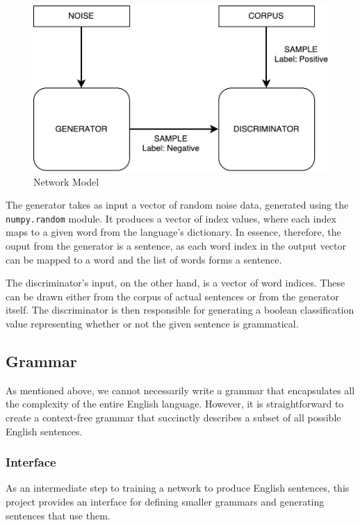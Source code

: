 \documentclass[11pt]{article}
\begin{document}
\begin{figure}[ht]
    \centering
    \includegraphics[scale=0.5]{img/network_model.pdf}
    \caption{Network Model}
    \label{fig:net_model}
\end{figure}

The generator takes as input a vector of random noise data, generated using the \texttt{numpy.random} module. It produces a vector of index values, where each index maps to a given word from the language's dictionary. In essence, therefore, the ouput from the generator is a sentence, as each word index in the output vector can be mapped to a word and the list of words forms a sentence.

The discriminator's input, on the other hand, is a vector of word indices. These can be drawn either from the corpus of actual sentences or from the generator itself. The discriminator is then responsible for generating a boolean classification value representing whether or not the given sentence is grammatical.

\subsection{Grammar}

As mentioned above, we cannot necessarily write a grammar that encapsulates all the complexity of the entire English language. However, it is straightforward to create a context-free grammar that succinctly describes a subset of all possible English sentences.

\subsubsection{Interface}

As an intermediate step to training a network to produce English sentences, this project provides an interface for defining smaller grammars and generating sentences that use them.
\end{document}
